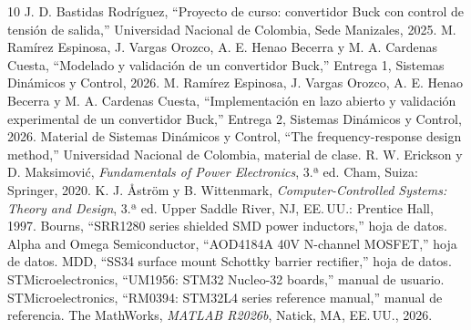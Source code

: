 \documentclass[conference,letterpaper]{IEEEtran}
\begin{document}
\begin{thebibliography}{10}
 J. D. Bastidas Rodríguez, ``Proyecto de curso: convertidor Buck con control de tensión de salida,'' Universidad Nacional de Colombia, Sede Manizales, 2025.
 M. Ramírez Espinosa, J. Vargas Orozco, A. E. Henao Becerra y M. A. Cardenas Cuesta, ``Modelado y validación de un convertidor Buck,'' Entrega 1, Sistemas Dinámicos y Control, 2026.
 M. Ramírez Espinosa, J. Vargas Orozco, A. E. Henao Becerra y M. A. Cardenas Cuesta, ``Implementación en lazo abierto y validación experimental de un convertidor Buck,'' Entrega 2, Sistemas Dinámicos y Control, 2026.
 Material de Sistemas Dinámicos y Control, ``The frequency-response design method,'' Universidad Nacional de Colombia, material de clase.
 R. W. Erickson y D. Maksimović, \emph{Fundamentals of Power Electronics}, 3.ª ed. Cham, Suiza: Springer, 2020.
 K. J. Åström y B. Wittenmark, \emph{Computer-Controlled Systems: Theory and Design}, 3.ª ed. Upper Saddle River, NJ, EE.\,UU.: Prentice Hall, 1997.
 Bourns, ``SRR1280 series shielded SMD power inductors,'' hoja de datos.
 Alpha and Omega Semiconductor, ``AOD4184A 40V N-channel MOSFET,'' hoja de datos.
 MDD, ``SS34 surface mount Schottky barrier rectifier,'' hoja de datos.
 STMicroelectronics, ``UM1956: STM32 Nucleo-32 boards,'' manual de usuario.
 STMicroelectronics, ``RM0394: STM32L4 series reference manual,'' manual de referencia.
 The MathWorks, \emph{MATLAB R2026b}, Natick, MA, EE.\,UU., 2026.
\end{thebibliography}
\end{document}
